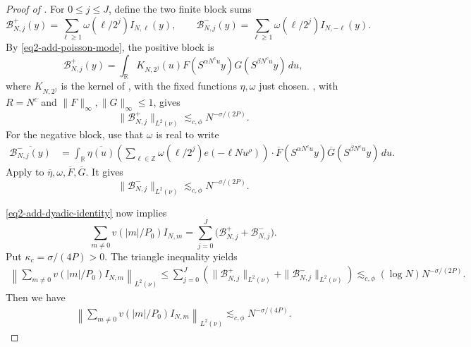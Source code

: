 \documentclass[reqno,12pt]{amsart}
\def \Z {\mathbb Z}
\def \R {\mathbb R}
\numberwithin{equation}{section}
\begin{document}
\begin{proof}[Proof of ]
For $0\le j\le J$, define the two finite block sums
\[
 \mathcal B_{N,j}^{+}(y)=\sum_{\ell\ge1}\omega(\ell/2^j)I_{N,\ell}(y),
 \qquad
 \mathcal B_{N,j}^{-}(y)=\sum_{\ell\ge1}\omega(\ell/2^j)I_{N,-\ell}(y).
\]
By \eqref{eq2-add-poisson-mode}, the positive block is
\[
 \mathcal B_{N,j}^{+}(y)=
 \int_\R K_{N,2^j}(u)
 F(S^{\alpha N^cu}y)G(S^{\beta N^cu}y)\,du,
\]
where $K_{N,2^j}$ is the kernel of , with the
fixed functions $\eta,\omega$ just chosen. ,
with $R=N^c$
and $\|F\|_\infty,\|G\|_\infty\le1$, gives
\[
 \|\mathcal B_{N,j}^{+}\|_{L^2(\nu)}\lesssim_{c,\phi} N^{-\sigma/(2P)}.
\]
For the negative
block, use that $\omega$ is real to write
\begin{align*}
 \overline{\mathcal B_{N,j}^{-}(y)}
 &=\int_\R\overline{\eta(u)}
 \left(\sum_{\ell\in\Z}\omega(\ell/2^j)e(-\ell Nu^\rho)\right)
 \cdot\overline F(S^{\alpha N^cu}y)
 \overline G(S^{\beta N^cu}y)\,du.
\end{align*}
Apply  to $\overline\eta,\omega,\overline F,
\overline G$. It gives
\[
 \|\mathcal B_{N,j}^{-}\|_{L^2(\nu)}\lesssim_{c,\phi} N^{-\sigma/(2P)}.
\]

\eqref{eq2-add-dyadic-identity} now implies
\[
 \sum_{m\ne0}v(|m|/P_0)I_{N,m}
 =\sum_{j=0}^J\bigl(\mathcal B_{N,j}^{+}+\mathcal B_{N,j}^{-}\bigr).
\]
Put
$\kappa_c=\sigma/(4P)>0$. The triangle inequality yields
\begin{align*}
 \left\|\sum_{m\ne0}v(|m|/P_0)I_{N,m}\right\|_{L^2(\nu)}
 \le\sum_{j=0}^J\left(
 \|\mathcal B_{N,j}^{+}\|_{L^2(\nu)}
 +\|\mathcal B_{N,j}^{-}\|_{L^2(\nu)}\right)
 \lesssim_{c,\phi}(\log N)N^{-\sigma/(2P)}.
\end{align*}
Then we have 
\begin{align}
 \left\|\sum_{m\ne0}v(|m|/P_0)I_{N,m}\right\|_{L^2(\nu)}
 \lesssim_{c,\phi} N^{-\sigma/(4P)}.
 \label{eq2-add-low-frequency}
\end{align}


\end{proof}
\end{document}
